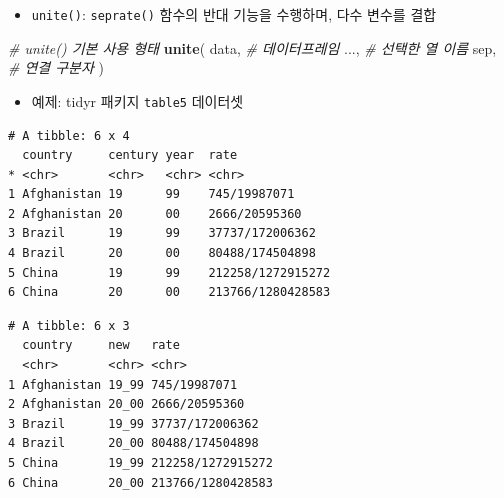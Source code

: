\documentclass[
  11pt,
]{krantz}
\newenvironment{Shaded}{\begin{snugshade}}{\end{snugshade}}
\newcommand{\CommentTok}[1]{\textcolor[rgb]{0.37,0.37,0.37}{\textit{#1}}}
\newcommand{\KeywordTok}[1]{\textcolor[rgb]{0.27,0.27,0.27}{\textbf{#1}}}
\newcommand{\NormalTok}[1]{#1}
\newcommand{\OperatorTok}[1]{\textcolor[rgb]{0.43,0.43,0.43}{\textbf{#1}}}
\newcommand{\StringTok}[1]{\textcolor[rgb]{0.5,0.5,0.5}{#1}}
\providecommand{\tightlist}{%
  \setlength{\itemsep}{0pt}\setlength{\parskip}{0pt}}
\begin{document}
\begin{itemize}
\tightlist
\item
  \texttt{unite()}: \texttt{seprate()} 함수의 반대 기능을 수행하며, 다수 변수를 결합
\end{itemize}

\footnotesize

\begin{Shaded}
\begin{Highlighting}[]
\CommentTok{# unite() 기본 사용 형태}
\KeywordTok{unite}\NormalTok{(}
\NormalTok{  data, }\CommentTok{# 데이터프레임}
\NormalTok{  ..., }\CommentTok{# 선택한 열 이름}
\NormalTok{  sep, }\CommentTok{# 연결 구분자}
\NormalTok{)}
\end{Highlighting}
\end{Shaded}

\normalsize

\begin{itemize}
\tightlist
\item
  예제: tidyr 패키지 \texttt{table5} 데이터셋
\end{itemize}

\footnotesize

\begin{Shaded}
\end{Shaded}

\begin{verbatim}
# A tibble: 6 x 4
  country     century year  rate             
* <chr>       <chr>   <chr> <chr>            
1 Afghanistan 19      99    745/19987071     
2 Afghanistan 20      00    2666/20595360    
3 Brazil      19      99    37737/172006362  
4 Brazil      20      00    80488/174504898  
5 China       19      99    212258/1272915272
6 China       20      00    213766/1280428583
\end{verbatim}

\begin{Shaded}
\end{Shaded}

\begin{verbatim}
# A tibble: 6 x 3
  country     new   rate             
  <chr>       <chr> <chr>            
1 Afghanistan 19_99 745/19987071     
2 Afghanistan 20_00 2666/20595360    
3 Brazil      19_99 37737/172006362  
4 Brazil      20_00 80488/174504898  
5 China       19_99 212258/1272915272
6 China       20_00 213766/1280428583
\end{verbatim}
\end{document}
